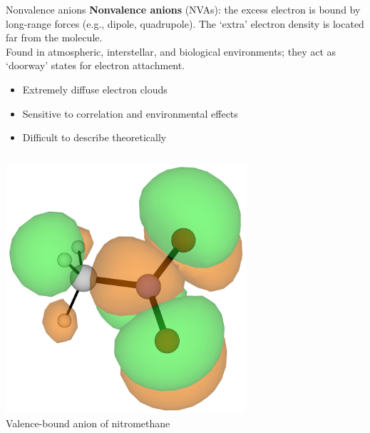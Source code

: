 \documentclass[9pt,t,xcolor=table]{beamer}
\begin{document}
\begin{frame}{\huge Nonvalence anions}\large
    \vspace{5pt}
	\textbf{Nonvalence anions} (NVAs): the excess electron is bound by long-range forces (e.g., dipole, quadrupole). The `extra' electron density is located far from the molecule.\\
	Found in atmospheric, interstellar, and biological environments; they act as `doorway' states for electron attachment. 
    \begin{itemize} 

            \item Extremely diffuse electron clouds
            \item Sensitive to correlation and environmental effects
            \item Difficult to describe theoretically
    \end{itemize}
    \vspace{5pt}
	\begin{columns}
		\begin{column}{0.27\textwidth}
			\centering
			\includegraphics[width=0.7\textwidth]{Figs/MeNO2_VBS.png}\\
			\vspace{3pt}
			\small Valence-bound anion of nitromethane
		\end{column}
		\begin{column}{0.3\textwidth}
			\centering

\end{column}
\end{columns}
\end{frame}
\end{document}

